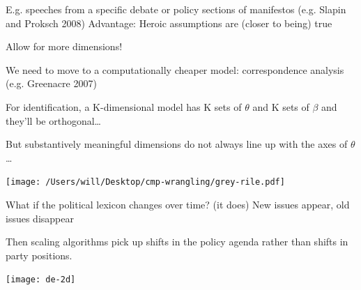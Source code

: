 \documentclass{mediumfoils}
\begin{document}
\itm E.g. speeches from a specific debate or policy sections of manifestos (e.g.  Slapin and Proksch 2008)
\itz
Advantage: Heroic assumptions are (closer to being) true



Allow for more dimensions!

We need to move to a computationally cheaper model: correspondence analysis (e.g. Greenacre 2007)

For identification, a K-dimensional model has K sets of $\theta$ and K sets of $\beta$ 
\ita
\itm and they'll be orthogonal\ldots
\itz



But substantively meaningful dimensions do not always line up with the axes of $\theta$\ldots

\newpage

\centerline{\texttt{[image: /Users/will/Desktop/cmp-wrangling/grey-rile.pdf]}}


What if the political lexicon changes over time? (it does)
\ita
\itm New issues appear, old issues disappear
\itz

Then scaling algorithms pick up shifts in the policy agenda rather than shifts in party positions. 


\centerline{\texttt{[image: de-2d]}}

\end{document}
